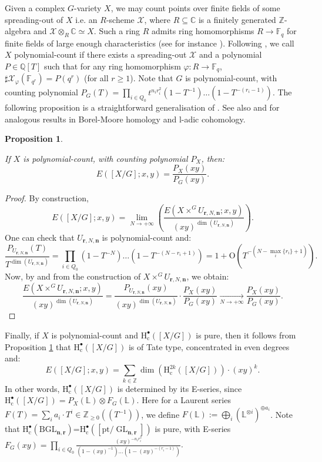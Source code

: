 \documentclass[11pt,english]{article}
\numberwithin{equation}{section}
\numberwithin{figure}{section}
\theoremstyle{definition}
\theoremstyle{plain}
\newtheorem{prop}[df]{Proposition}
\theoremstyle{remark}
\DeclareMathOperator{\GL}{GL}
\newcommand\nn{\mathbf{n}}
\newcommand\rr{\mathbf{r}}
\newcommand\HH{\mathrm{H}}
\newcommand\ZZ{\mathbb{Z}}
\newcommand\FF{\mathbb{F}}
\newcommand\CC{\mathbb{C}}
\begin{document}
Given a complex $G$-variety $X$, we may count points over finite
fields of some spreading-out of $X$ i.e. an $R$-scheme $\mathcal{X}$,
where $R\subseteq\CC$ is a finitely generated $\ZZ$-algebra and
$\mathcal{X}\otimes_{R}\CC\simeq X$. Such a ring $R$ admits ring
homomorphisms $R\rightarrow\FF_{q}$ for finite fields of large enough
characteristics (see for instance \cite[Ch. 1, Lem. 2.2.6.]{CLNS18}).
Following \cite[Appendix]{HRV08}, we call $X$ polynomial-count if
there exists a spreading-out $\mathcal{X}$ and a polynomial $P\in\mathbb{Q}[T]$
such that for any ring homomorphism $\varphi:R\rightarrow\FF_{q}$,
$\sharp\mathcal{X}_{\varphi}(\FF_{q^{r}})=P(q^{r})$ (for all $r\geq1$).
Note that $G$ is polynomial-count, with counting polynomial $P_{G}(T)=\prod_{i\in Q_{0}}t^{n_{i}r_{i}^{2}}(1-T^{-1})\ldots(1-T^{-(r_{i}-1)})$.
The following proposition is a straightforward generalisation of \cite[Thm. 6.1.2.]{HRV08}.
See also \cite[\S 2.5.]{SV20} and \cite[\S 2.2]{LRV23} for analogous
results in Borel-Moore homology and l-adic cohomology.

\begin{prop} \label{Prop/E-seriesVSCountF_q}

If $X$ is polynomial-count, with counting polynomial $P_{X}$, then:\[
E([X/G];x,y)=\frac{P_X(xy)}{P_G(xy)}.
\]

\end{prop}

\begin{proof}

By construction,\[
E([X/G];x,y)=
\underset{N\rightarrow +\infty}{\lim}
\left(
\frac{E\left( X\times^GU_{\rr,N,\nn};x,y\right)}{(xy)^{\dim(U_{\rr,N,\nn})}}
\right)
.
\] One can check that $U_{\rr,N,\nn}$ is polynomial-count and:\[
\frac{P_{U_{\rr,N,\nn}}(T)}{T^{\dim(U_{\rr,N,\nn})}}
=
\prod_{i\in Q_0}(1-T^{-N})\ldots(1-T^{-(N-r_i+1)})
=1+\mathrm{O}(T^{-(N-\max_i\{r_i\}+1)}).
\] Now, by \cite[Thm. 6.1.2.]{HRV08} and from the construction of $X\times^{G}U_{\rr,N,\nn}$,
we obtain:\[
\frac{E\left( X\times^GU_{\rr,N,\nn};x,y\right)}{(xy)^{\dim(U_{\rr,N,\nn})}}
=
\frac{P_{U_{\rr,N,\nn}}(xy)}{(xy)^{\dim(U_{\rr,N,\nn})}}
\cdot
\frac{P_X(xy)}{P_G(xy)}
\underset{N\rightarrow +\infty}{\longrightarrow}
\frac{P_X(xy)}{P_G(xy)}.
\]\end{proof}

Finally, if $X$ is polynomial-count and $\HH_{\mathrm{c}}^{\bullet}([X/G])$
is pure, then it follows from Proposition \ref{Prop/E-seriesVSCountF_q}
that $\HH_{\mathrm{c}}^{\bullet}([X/G])$ is of Tate type, concentrated
in even degrees and:\[
E([X/G];x,y)=\sum_{k\in\ZZ}\dim\left(\HH_{\mathrm{c}}^{2k}([X/G])\right)\cdot (xy)^k.
\]In other words, $\HH_{\mathrm{c}}^{\bullet}([X/G])$ is determined
by its E-series, since $\HH_{\mathrm{c}}^{\bullet}([X/G])=P_{X}(\mathbb{L})\otimes F_{G}(\mathbb{L})$.
Here for a Laurent series $F(T)=\sum_{i}a_{i}\cdot T^{i}\in\ZZ_{\geq0}((T^{-1}))$,
we define $F(\mathbb{L}):=\bigoplus_{i}\left(\mathbb{L}^{\otimes i}\right)^{\oplus a_{i}}$.
Note that $\HH_{\mathrm{c}}^{\bullet}(\mathrm{BGL}_{\nn,\rr})$=$\HH_{\mathrm{c}}^{\bullet}([\mathrm{pt}/\GL_{\nn,\rr}])$
is pure, with E-series $F_{G}(xy)=\prod_{i\in Q_{0}}\frac{(xy)^{-n_{i}r_{i}^{2}}}{(1-(xy)^{-1})\ldots(1-(xy)^{-(r_{i}-1)})}$.
\end{document}
